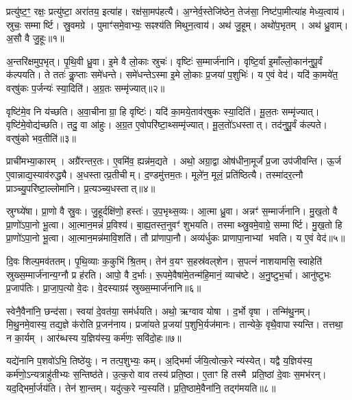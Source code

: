 प्रत्यु॑ष्ट॒ꣳ॒ रक्षः॒ प्रत्यु॑ष्टा॒ अरा॑तय॒ इत्या॑ह।
रक्ष॑सा॒मप॑हत्यै।
अ॒ग्नेर्व॒स्तेजि॑ष्ठेन॒ तेज॑सा॒ निष्ट॑पा॒मीत्या॑ह मेध्य॒त्वाय॑।
स्रुचः॒ सम्मार्ष्टि।
स्रु॒वमग्रे।
पुमाꣳ॑समे॒वाभ्यः॒ सꣴश्य॑ति मिथुन॒त्वाय॑।
अथ॑ जु॒हूम्।
अथो॑प॒भृतम्।
अथ॑ ध्रु॒वाम्।
अ॒सौ वै जु॒हूः॥१॥

अ॒न्तरि॑क्षमुप॒भृत्।
पृ॒थि॒वी ध्रु॒वा।
इ॒मे वै लो॒काः स्रुचः॑।
वृष्टिः॑ स॒म्मार्ज॑नानि।
वृष्टि॒र्वा इ॒माँल्लो॒कान॑नुपू॒र्वं क॑ल्पयति।
ते ततः॑ कॢ॒प्ताः समे॑धन्ते।
समे॑धन्ते\-ऽस्मा इ॒मे लो॒काः प्र॒जया॑ प॒शुभिः॑।
य ए॒वं वेद॑।
यदि॑ का॒मये॑त॒ वर्‌\mbox{}षु॑कः प॒र्जन्यः॑ स्या॒दिति॑।
अ॒ग्र॒तः सम्मृ॑ज्यात्॥२॥

वृष्टि॑मे॒व नि य॑च्छति।
अ॒वा॒चीनाग्रा॒ हि वृष्टिः॑।
यदि॑ का॒मये॒ताव॑र्‌\mbox{}षुकः स्या॒दिति॑।
मू॒ल॒तः सम्मृ॑ज्यात्।
वृष्टि॑मे॒वोद्य॑च्छति।
तदु॒ वा आ॑हुः।
अ॒ग्र॒त ए॒वोपरि॑ष्टा॒थ्सम्मृ॑ज्यात्।
मू॒ल॒तो॑\-ऽधस्तात्।
तद॑नुपू॒र्वं क॑ल्पते।
वर्‌\mbox{}षु॑को भव॒तीति॑॥३॥

प्राची॑मभ्या॒कारम्।
अग्रै॑रन्तर॒तः।
ए॒वमि॑व॒ ह्यन्न॑म॒द्यते।
अथो॒ अग्रा॒द्वा ओष॑धीना॒मूर्जं॑ प्र॒जा उप॑जीवन्ति।
ऊ॒र्ज ए॒वान्नाद्य॒स्याव॑रुद्ध्यै।
अ॒धस्तात्प्र॒तीचीम्।
द॒ण्डमु॑त्तम॒तः।
मूले॑न॒ मूलं॒ प्रति॑ष्ठित्यै।
तस्मा॑दर॒त्नौ प्राञ्च्यु॒परि॑ष्टा॒ल्लोमा॑नि।
प्र॒त्यञ्च्य॒धस्तात्॥४॥

स्रुग्घ्ये॑षा।
प्रा॒णो वै स्रु॒वः।
जु॒हूर्दक्षि॑णो॒ हस्तः॑।
उ॒प॒भृथ्स॒व्यः।
आ॒त्मा ध्रु॒वा।
अन्नꣳ॑ स॒म्मार्ज॑नानि।
मु॒ख॒तो वै प्रा॒णो॑\-ऽपा॒नो भू॒त्वा।
आ॒त्मान॒मन्नं॑ प्र॒विश्य॑।
बा॒ह्य॒तस्त॒नुवꣳ॑ शुभयति।
तस्माथ्स्रु॒वमे॒वाग्रे॒ सम्मार्ष्टि।
मु॒ख॒तो हि प्रा॒णो॑\-ऽपा॒नो भू॒त्वा।
आ॒त्मान॒मन्न॑मावि॒शति॑।
तौ प्रा॑णापा॒नौ।
अव्य॑र्धुकः प्राणापा॒नाभ्यां भवति।
य ए॒वं वेद॑॥५॥\anuvakamend[जु॒हूर्मृ॑ज्याद्भव॒तीति॑ प्र॒त्यञ्च्य॒धस्तान्मार्ष्टि॒ पञ्च॑ च]

दि॒वः शिल्प॒मव॑ततम्।
पृ॒थि॒व्याः क॒कुभि॑ श्रि॒तम्।
तेन॑ व॒यꣳ स॒हस्र॑वल्‌शेन।
स॒पत्नं॑ नाशयामसि॒ स्वाहेति॑ स्रुख्स॒म्मार्ज॑नान्य॒ग्नौ प्र ह॑रति।
आपो॒ वै द॒र्भाः।
रू॒पमे॒वैषा॑मे॒तन्म॑हि॒मानं॒ व्याच॑ष्टे।
अ॒नु॒ष्टुभ॒र्चा।
आनु॑ष्टुभः प्र॒जाप॑तिः।
प्रा॒जा॒प॒त्यो वे॒दः।
वे॒दस्याग्रꣴ॑ स्रुख्स॒म्मार्ज॑नानि॥६॥

स्वेनै॒वैना॑नि॒ छन्द॑सा।
स्वया॑ दे॒वत॑या॒ सम॑र्धयति।
अथो॒ ऋग्वाव योषा।
द॒र्भो वृषा।
तन्मि॑थु॒नम्।
मि॒थु॒नमे॒वास्य॒ तद्य॒ज्ञे क॑रोति प्र॒जन॑नाय।
प्रजा॑यते प्र॒जया॑ प॒शुभि॒र्यज॑मानः।
तान्येके॒ वृथै॒वापास्यन्ति।
तत्तथा॒ न का॒र्यम्।
आर॑ब्धस्य य॒ज्ञिय॑स्य॒ कर्म॑णः॒ सवि॑दो॒हः॥७॥

यद्ये॑नानि प॒शवो॑ऽभि॒ तिष्ठे॑युः।
न तत्प॒शुभ्यः॒ कम्।
अ॒द्भिर्मार्जयि॒त्वोत्क॒रे न्य॑स्येत्।
यद्वै य॒ज्ञिय॑स्य॒ कर्म॑णो॒\-ऽन्यत्राहु॑तीभ्यः स॒न्तिष्ठ॑ते।
उ॒त्क॒रो वाव तस्य॑ प्रति॒ष्ठा।
ए॒ताꣳ हि तस्मै प्रति॒ष्ठां दे॒वाः स॒मभ॑रन्।
यद॒द्भिर्मा॒र्जय॑ति।
तेन॑ शा॒न्तम्।
यदु॑त्क॒रे न्य॒स्यति॑।
प्र॒ति॒ष्ठामे॒वैना॑नि॒ तद्ग॑मयति॥८॥

